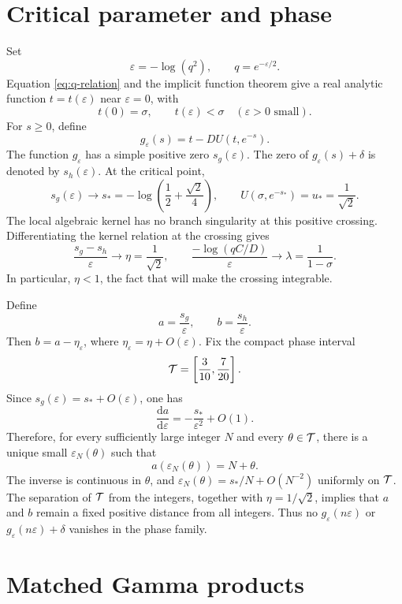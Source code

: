 \documentclass[11pt]{article}
\theoremstyle{definition}
\theoremstyle{remark}
\newcommand{\eps}{\varepsilon}
\newcommand{\dd}{\mathrm d}
\begin{document}
\section{Critical parameter and phase}\label{sec:phase}

Set
\[
  \eps=-\log(q^2),\qquad q=e^{-\eps/2}.
\]
Equation \eqref{eq:q-relation} and the implicit function theorem give a real
analytic function \(t=t(\eps)\) near \(\eps=0\), with
\[
  t(0)=\sigma,\qquad t(\eps)<\sigma\quad(\eps>0\text{ small}).
\]
For \(s\geq0\), define
\[
  g_\eps(s)=t-DU(t,e^{-s}).
\]
The function \(g_\eps\) has a simple positive zero \(s_g(\eps)\).  The zero
of \(g_\eps(s)+\delta\) is denoted by \(s_h(\eps)\).  At the critical point,
\[
  s_g(\eps)\longrightarrow s_*=
  -\log\left(\frac12+\frac{\sqrt2}{4}\right),
  \qquad
  U(\sigma,e^{-s_*})=u_*=\frac1{\sqrt2}.
\]
The local algebraic kernel has no branch singularity at this positive
crossing.  Differentiating the kernel relation at the crossing gives
\[
  \frac{s_g-s_h}{\eps}\longrightarrow
  \eta=\frac1{\sqrt2},
  \qquad
  \frac{-\log(qC/D)}{\eps}\longrightarrow
  \lambda=\frac1{1-\sigma}.
\]
In particular, \(\eta<1\), the fact that will make the crossing integrable.

Define
\[
  a=\frac{s_g}{\eps},\qquad b=\frac{s_h}{\eps}.
\]
Then \(b=a-\eta_\eps\), where \(\eta_\eps=\eta+O(\eps)\).  Fix the compact
phase interval
\[
  {\cal T}=\left[\frac3{10},\frac7{20}\right].
\]
Since \(s_g(\eps)=s_*+O(\eps)\), one has
\[
  \frac{\dd a}{\dd\eps}=-\frac{s_*}{\eps^2}+O(1).
\]
Therefore, for every sufficiently large integer \(N\) and every
\(\theta\in{\cal T}\), there is a unique small \(\eps_N(\theta)\) such that
\begin{equation}\label{eq:phase}
  a(\eps_N(\theta))=N+\theta.
\end{equation}
The inverse is continuous in \(\theta\), and
\(\eps_N(\theta)=s_*/N+O(N^{-2})\) uniformly on \({\cal T}\).  The
separation of \({\cal T}\) from the integers, together with
\(\eta=1/\sqrt2\), implies that \(a\) and \(b\) remain a fixed positive
distance from all integers.  Thus no \(g_\eps(n\eps)\) or
\(g_\eps(n\eps)+\delta\) vanishes in the phase family.

\section{Matched Gamma products}\label{sec:gamma}
\end{document}
